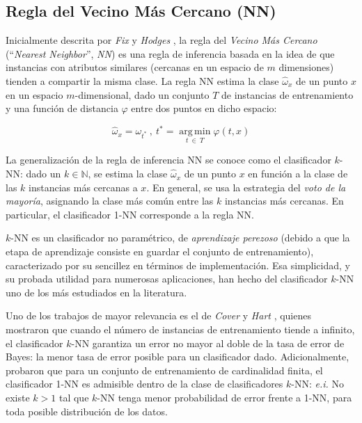 \subsection{Regla del Vecino Más Cercano (NN)}

Inicialmente descrita por \emph{Fix} y \emph{Hodges} \cite{fix_51_discriminatory}, la regla del \emph{Vecino Más Cercano} (``\emph{Nearest Neighbor}'', \emph{NN}) es una regla de inferencia basada en la idea de que instancias con atributos similares (cercanas en un espacio de $m$ dimensiones) tienden a compartir la misma clase. La regla NN estima la clase $\hat{\omega}_x$ de un punto $x$ en un espacio $m$-dimensional, dado un conjunto $T$ de instancias de entrenamiento y una función de distancia $\varphi$ entre dos puntos en dicho espacio:

\begin{equation}
\hat{\omega}_x = \omega_{t^*}\ ,\ 
t^* = \operatorname*{arg\,min}_{t\ \in\ T} \varphi(t,x)
\end{equation}

La generalización de la regla de inferencia NN se conoce como el clasificador $k$-NN: dado un $k \in \mathbb{N}$, se estima la clase $\hat{\omega}_x$ de un punto $x$ en función a la clase de las $k$ instancias más cercanas a $x$. En general, se usa la estrategia del \guillemotleft\emph{voto de la mayoría}\guillemotright, asignando la clase más común entre las $k$ instancias más cercanas. En particular, el clasificador 1-NN corresponde a la regla NN.

$k$-NN es un clasificador no paramétrico, de \emph{aprendizaje perezoso} (debido a que la etapa de aprendizaje consiste en guardar el conjunto de entrenamiento), caracterizado por su sencillez en términos de implementación. Esa simplicidad, y su probada utilidad para numerosas aplicaciones, han hecho del clasificador $k$-NN uno de los más estudiados en la literatura.

Uno de los trabajos de mayor relevancia es el de \emph{Cover} y \emph{Hart} \cite{Cover:2006:NNP:2263261.2267456}, quienes mostraron que cuando el número de instancias de entrenamiento tiende a infinito, el clasificador $k$-NN garantiza un error no mayor al doble de la tasa de error de Bayes: la menor tasa de error posible para un clasificador dado. Adicionalmente, probaron que para un conjunto de entrenamiento de cardinalidad finita, el clasificador 1-NN es admisible dentro de la clase de clasificadores $k$-NN: \emph{e.i.} No existe $k > 1$ tal que $k$-NN tenga menor probabilidad de error frente a 1-NN, para toda posible distribución de los datos.


